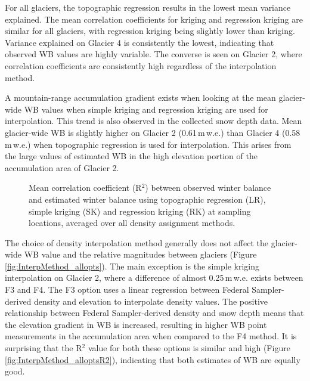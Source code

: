 \documentclass{sfuthesis}
\begin{document}
For all glaciers, the topographic regression results in the lowest mean variance explained. The mean correlation coefficients for kriging and regression kriging are similar for all glaciers, with regression kriging being slightly lower than kriging. Variance explained on Glacier 4 is consistently the lowest, indicating that observed WB values are highly variable. The converse is seen on Glacier 2, where correlation coefficients are consistently high regardless of the interpolation method.

A mountain-range accumulation gradient exists when looking at the mean glacier-wide WB values when simple kriging and regression kriging are used for interpolation. This trend is also observed in the collected snow depth data. Mean glacier-wide WB is slightly higher on Glacier 2 (0.61\,m\,w.e.) than Glacier 4 (0.58\,m\,w.e.) when topographic regression is used for interpolation. This arises from the large values of estimated WB in the high elevation portion of the accumulation area of Glacier 2.

\begin{figure}[H]
	\caption{Mean correlation coefficient (R$^2$) between observed winter balance and estimated winter balance using topographic regression (LR), simple kriging (SK) and regression kriging (RK) at sampling locations, averaged over all density assignment methods.}
	\label{fig:InterpMethod_meanR2}
\end{figure}

The choice of density interpolation method generally does not affect the glacier-wide WB value and the relative magnitudes between glaciers (Figure \ref{fig:InterpMethod_allopts}). The main exception is the simple kriging interpolation on Glacier 2, where a difference of almost 0.25\,m\,w.e. exists between F3 and F4. The F3 option uses a linear regression between Federal Sampler-derived density and elevation to interpolate density values. The positive relationship between Federal Sampler-derived density and snow depth means that the elevation gradient in WB is increased, resulting in higher WB point measurements in the accumulation area when compared to the F4 method.  It is surprising that the R$^2$ value for both these options is similar and high (Figure \ref{fig:InterpMethod_alloptsR2}), indicating that both estimates of WB are equally good.
\end{document}
